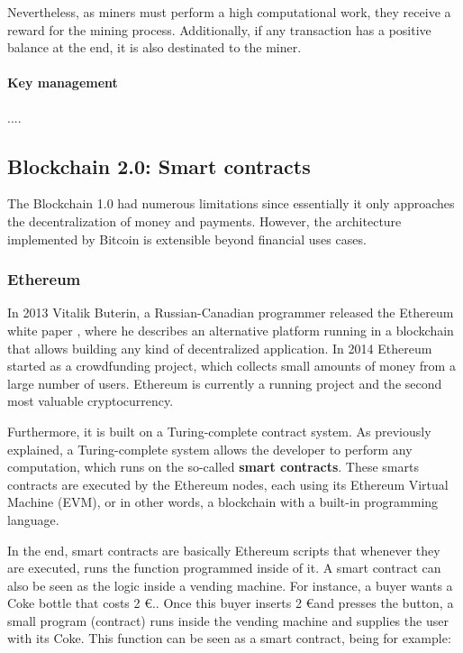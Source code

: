 Nevertheless, as miners must perform a high computational work, they receive a reward for the mining process. Additionally, if any transaction has a positive balance at the end, it is also destinated to the miner.

\paragraph{Key management}

....

\subsection{Blockchain 2.0: Smart contracts}

The Blockchain 1.0 had numerous limitations since essentially it only approaches the decentralization of money and payments. However, the architecture implemented by Bitcoin is extensible beyond financial uses cases.

\subsubsection{Ethereum}

In 2013 Vitalik Buterin, a Russian-Canadian programmer released the Ethereum white paper \cite{buterin2014next}, where he describes an alternative platform running in a blockchain that allows building any kind of decentralized application. In 2014 Ethereum started as a crowdfunding project, which collects small amounts of money from a large number of users.  Ethereum is currently a running project and the second most valuable cryptocurrency.

Furthermore, it is built on a Turing-complete contract system. As previously explained, a Turing-complete system allows the developer to perform any computation, which runs on the so-called \textbf{smart contracts}. These smarts contracts are executed by the Ethereum nodes, each using its Ethereum Virtual Machine (EVM), or in other words, a blockchain with a built-in programming language.

In the end, smart contracts are basically Ethereum scripts that whenever they are executed, runs the function programmed inside of it. A smart contract can also be seen as the logic inside a vending machine. For instance, a buyer wants a Coke bottle that costs 2 \euro.. Once this buyer inserts 2 \euro and presses the button, a small program (contract) runs inside the vending machine and supplies the user with its Coke. This function can be seen as a smart contract, being for example:

